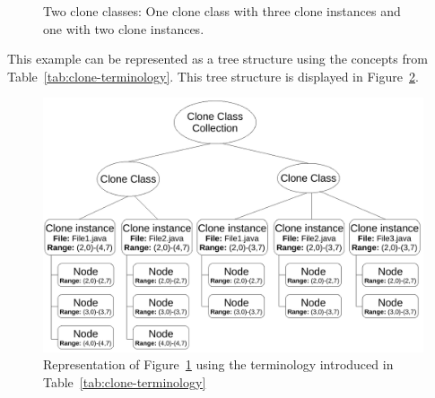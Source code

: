 \begin{figure}[H]
\begin{parcolumns}{3}
\end{parcolumns}
\caption{Two clone classes: One clone class with three clone instances and one with two clone instances.}
\label{fig:cloneclasses}
\end{figure}

This example can be represented as a tree structure using the concepts from Table~\ref{tab:clone-terminology}. This tree structure is displayed in Figure~\ref{fig:terminologyexample}.

\begin{figure}[H]
  \includegraphics[width=1\columnwidth]{img/TerminologyExample}
  \caption{Representation of Figure~\ref{fig:cloneclasses} using the terminology introduced in Table~\ref{tab:clone-terminology}}
  \label{fig:terminologyexample}
\end{figure}

